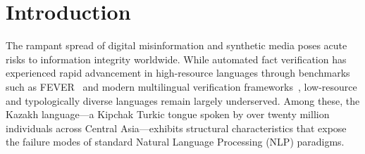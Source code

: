 \section{Introduction}
\label{sec:intro}

The rampant spread of digital misinformation and synthetic media poses acute risks to information integrity worldwide. While automated fact verification has experienced rapid advancement in high-resource languages through benchmarks such as FEVER~\citep{thorne2018fever} and modern multilingual verification frameworks~\citep{mitra-etal-2025-factlens}, low-resource and typologically diverse languages remain largely underserved. Among these, the Kazakh language---a Kipchak Turkic tongue spoken by over twenty million individuals across Central Asia---exhibits structural characteristics that expose the failure modes of standard Natural Language Processing (NLP) paradigms.

